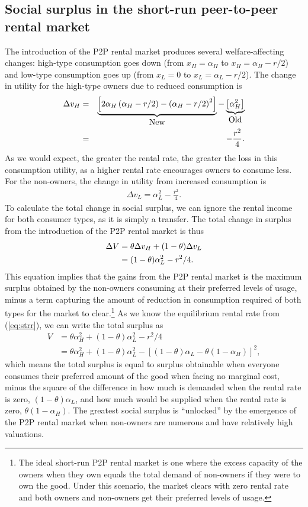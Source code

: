 \documentclass[11pt]{article}
\begin{document}
\subsection{Social surplus in the short-run peer-to-peer rental market}
The introduction of the P2P rental market produces several welfare-affecting changes: 
high-type consumption goes down (from $x_H = \alpha_H$ to  $x_H = \alpha_H - r/2$) and low-type consumption goes up (from $x_L = 0$ to $x_L = \alpha_L - r/2$). 
The change in utility for the high-type owners due to reduced consumption is 
\begin{eqnarray}
\Delta v_H &=& \underbrace{\left[2 \alpha_H \left(\alpha_H - r/2\right) - \left(\alpha_H - r/2\right)^2 \right]}_{\mbox{New}} - 
                             \underbrace{\left[\alpha_H^2 \right]}_{\mbox{Old}}   \notag \\
           &=& - \frac{r^2}{4}. 
\end{eqnarray} 
As we would expect, the greater the rental rate, the greater the loss in this consumption utility, as a higher rental rate encourages owners to consume less. 
For the non-owners, the change in utility from increased consumption is
\begin{align}
\Delta v_L = \alpha_L^2 - \frac{r^2}{4}. 
\end{align} 
To calculate the total change in social surplus, we can ignore the rental income for both consumer types, as it is simply a transfer. 
The total change in surplus from the introduction of the P2P rental market is thus 
\begin{align}
\Delta V &= \theta \Delta v_H + (1-\theta) \Delta v_L \notag \\ 
         & = (1-\theta) \alpha_L^2 - r^2/4.
\end{align}
This equation implies that the gains from the P2P rental market is the
maximum surplus obtained by the non-owners consuming at their
preferred levels of usage, minus a term capturing the amount of reduction in consumption required of both types for the market to clear.\footnote{
  The ideal short-run P2P rental market is one where the excess capacity of the owners when they own equals the total demand of non-owners if they were to own the good.
  Under this scenario, the market clears with zero rental rate and both owners and non-owners get their preferred levels of usage. 
}
As we know the equilibrium rental rate from (\ref{eq:strr}), we can write the total surplus as
\begin{align}
  V & = \theta \alpha_H^2 + (1-\theta)\alpha_L^2 - r^2/4 \\
    & = \theta \alpha_H^2 + (1-\theta)\alpha_L^2 - \left[(1-\theta) \alpha_L - \theta (1-\alpha_H) \right]^2,
\end{align} 
which means the total surplus is equal to surplus obtainable when everyone consumes their preferred amount of the good when facing no marginal cost, minus the square of the difference in how much is demanded when the rental rate is zero, $(1-\theta)\alpha_L$, and how much would be supplied when the rental rate is zero, $\theta (1-\alpha_H)$.
The greatest social surplus is ``unlocked'' by the emergence of the P2P rental market when non-owners are numerous and have relatively high valuations. 
\end{document}
